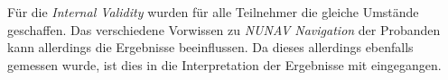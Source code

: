 Für die \textit{Internal Validity} wurden für alle Teilnehmer die gleiche Umstände geschaffen. Das verschiedene Vorwissen zu \textit{NUNAV Navigation} der Probanden kann allerdings die Ergebnisse beeinflussen. Da dieses allerdings ebenfalls gemessen wurde, ist dies in die Interpretation der Ergebnisse mit eingegangen.

\bigskip


